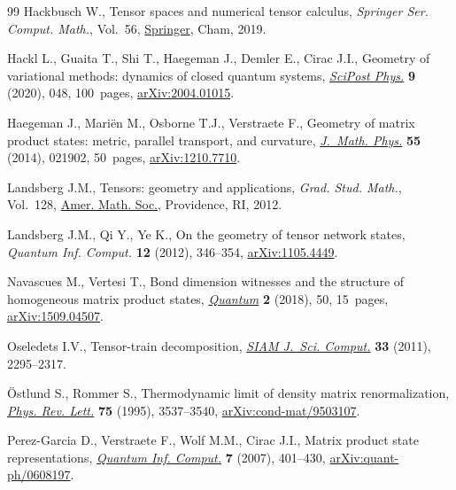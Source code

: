 \documentclass[pdftex]{sigma}
\numberwithin{equation}{section}
\begin{document}
\begin{thebibliography}{99}
Hackbusch W., Tensor spaces and numerical tensor calculus, \textit{Springer
  Ser. Comput. Math.}, Vol.~56, \href{https://doi.org/10.1007/978-3-030-35554-8}{Springer}, Cham, 2019.

Hackl L., Guaita T., Shi T., Haegeman J., Demler E., Cirac J.I., Geometry of
  variational methods: dynamics of closed quantum systems, \href{https://doi.org/10.21468/scipostphys.9.4.048}{\textit{SciPost
  Phys.}} \textbf{9} (2020), 048, 100~pages, \href{https://arxiv.org/abs/2004.01015}{arXiv:2004.01015}.

Haegeman J., Mari\"en M., Osborne T.J., Verstraete F., Geometry of matrix
  product states: metric, parallel transport, and curvature, \href{https://doi.org/10.1063/1.4862851}{\textit{J.~Math.
  Phys.}} \textbf{55} (2014), 021902, 50~pages, \href{https://arxiv.org/abs/1210.7710}{arXiv:1210.7710}.

Landsberg J.M., Tensors: geometry and applications, \textit{Grad. Stud. Math.},
  Vol.~128, \href{https://doi.org/10.1090/gsm/128}{Amer. Math. Soc.}, Providence, RI, 2012.

Landsberg J.M., Qi Y., Ye K., On the geometry of tensor network states,
  \textit{Quantum Inf. Comput.} \textbf{12} (2012), 346--354,
  \href{https://arxiv.org/abs/:1105.4449}{arXiv:1105.4449}.

Navascues M., Vertesi T., Bond dimension witnesses and the structure of
  homogeneous matrix product states, \href{https://doi.org/10.22331/q-2018-01-31-50}{\textit{Quantum}} \textbf{2} (2018), 50,
  15~pages, \href{https://arxiv.org/abs/1509.04507}{arXiv:1509.04507}.

Oseledets I.V., Tensor-train decomposition, \href{https://doi.org/10.1137/090752286}{\textit{SIAM J.~Sci. Comput.}}
  \textbf{33} (2011), 2295--2317.

\"Ostlund S., Rommer S., Thermodynamic limit of density matrix renormalization,
  \href{https://doi.org/10.1103/PhysRevLett.75.3537}{\textit{Phys. Rev. Lett.}} \textbf{75} (1995), 3537--3540,
  \href{https://arxiv.org/abs/cond-mat/9503107}{arXiv:cond-mat/9503107}.

Perez-Garcia D., Verstraete F., Wolf M.M., Cirac J.I., Matrix product state
  representations, \href{http://hdl.handle.net/1854/LU-8589272}{\textit{Quantum Inf. Comput.}} \textbf{7} (2007), 401--430,
  \href{https://arxiv.org/abs/quant-ph/0608197}{arXiv:quant-ph/0608197}.


\end{thebibliography}
\end{document}
